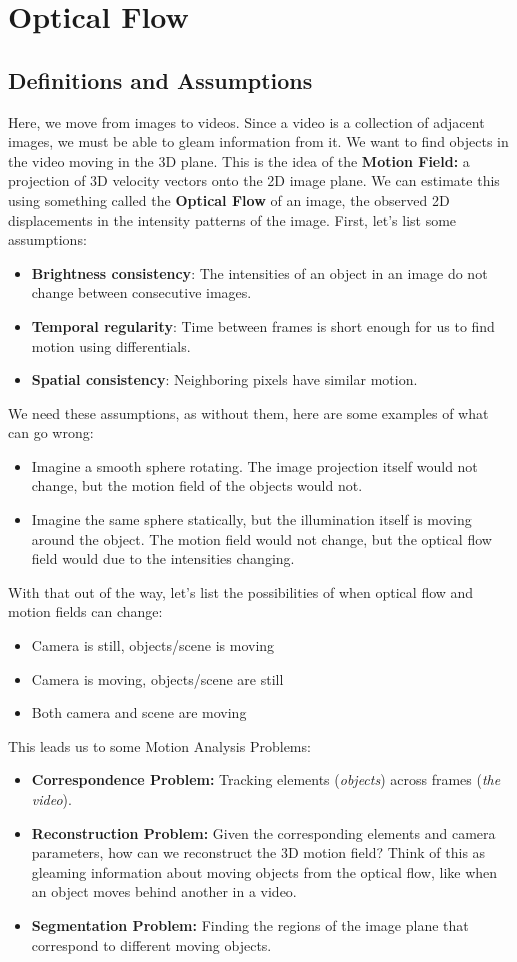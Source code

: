 \documentclass{article}
\begin{document}
\section{Optical Flow}
\subsection{Definitions and Assumptions}
Here, we move from images to videos. Since a video is a collection of adjacent images, we must be able to gleam information from it. We want to find objects in the video moving in the 3D plane. This is the idea of the \textbf{Motion Field:} a projection of 3D velocity vectors onto the 2D image plane. We can estimate this using something called the \textbf{Optical Flow} of an image, the observed 2D displacements in the intensity patterns of the image. First, let's list some assumptions:
\begin{itemize}
    \item \textbf{Brightness consistency}: The intensities of an object in an image do not change between consecutive images.
    \item \textbf{Temporal regularity}: Time between frames is short enough for us to find motion using differentials.
    \item \textbf{Spatial consistency}: Neighboring pixels have similar motion. 
\end{itemize}
We need these assumptions, as without them, here are some examples of what can go wrong:
\begin{itemize}
    \item Imagine a smooth sphere rotating. The image projection itself would not change, but the motion field of the objects would not.
    \item Imagine the same sphere statically, but the illumination itself is moving around the object. The motion field would not change, but the optical flow field would due to the intensities changing.
\end{itemize}
With that out of the way, let's list the possibilities of when optical flow and motion fields can change:
\begin{itemize}
    \item Camera is still, objects/scene is moving
    \item Camera is moving, objects/scene are still
    \item Both camera and scene are moving
\end{itemize}
This leads us to some Motion Analysis Problems:
\begin{itemize}
    \item \textbf{Correspondence Problem:} Tracking elements (\textit{objects}) across frames (\textit{the video}).
    \item \textbf{Reconstruction Problem:} Given the corresponding elements and camera parameters, how can we reconstruct the 3D motion field? Think of this as gleaming information about moving objects from the optical flow, like when an object moves behind another in a video. 
    \item \textbf{Segmentation Problem:} Finding the regions of the image plane that correspond to different moving objects. 
\end{itemize}
\end{document}
